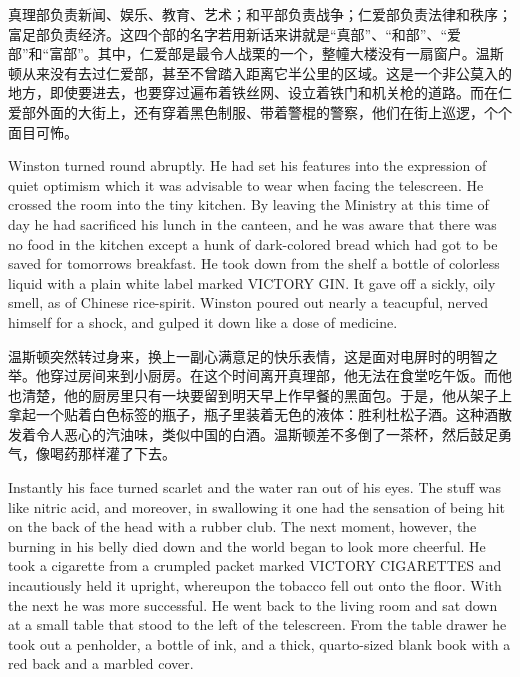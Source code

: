 \begin{paracol}{2}
真理部负责新闻、娱乐、教育、艺术；和平部负责战争；仁爱部负责法律和秩序；富足部负责经济。这四个部的名字若用新话来讲就是``真部''、``和部''、``爱部''和``富部''。其中，仁爱部是最令人战栗的一个，整幢大楼没有一扇窗户。温斯顿从来没有去过仁爱部，甚至不曾踏入距离它半公里的区域。这是一个非公莫入的地方，即使要进去，也要穿过遍布着铁丝网、设立着铁门和机关枪的道路。而在仁爱部外面的大街上，还有穿着黑色制服、带着警棍的警察，他们在街上巡逻，个个面目可怖。

\switchcolumn*

Winston turned round abruptly. He had set his features into the
expression of quiet optimism which it was advisable to wear when facing
the telescreen. He crossed the room into the tiny kitchen. By leaving
the Ministry at this time of day he had sacrificed his lunch in the
canteen, and he was aware that there was no food in the kitchen except a
hunk of dark-colored bread which had got to be saved for
tomorrow\textquotesingle s breakfast. He took down from the shelf a
bottle of colorless liquid with a plain white label marked \textsc{VICTORY
GIN}. It gave off a sickly, oily smell, as of Chinese rice-spirit.
Winston poured out nearly a teacupful, nerved himself for a shock, and
gulped it down like a dose of medicine.

\switchcolumn

温斯顿突然转过身来，换上一副心满意足的快乐表情，这是面对电屏时的明智之举。他穿过房间来到小厨房。在这个时间离开真理部，他无法在食堂吃午饭。而他也清楚，他的厨房里只有一块要留到明天早上作早餐的黑面包。于是，他从架子上拿起一个贴着白色标签的瓶子，瓶子里装着无色的液体：胜利杜松子酒。这种酒散发着令人恶心的汽油味，类似中国的白酒。温斯顿差不多倒了一茶杯，然后鼓足勇气，像喝药那样灌了下去。

\switchcolumn*

Instantly his face turned scarlet and the water ran out of his eyes. The
stuff was like nitric acid, and moreover, in swallowing it one had the
sensation of being hit on the back of the head with a rubber club. The
next moment, however, the burning in his belly died down and the world
began to look more cheerful. He took a cigarette from a crumpled packet
marked \textsc{VICTORY CIGARETTES} and incautiously held it upright, whereupon
the tobacco fell out onto the floor. With the next he was more
successful. He went back to the living room and sat down at a small
table that stood to the left of the telescreen. From the table drawer he
took out a penholder, a bottle of ink, and a thick, quarto-sized blank
book with a red back and a marbled cover.


\end{paracol}
